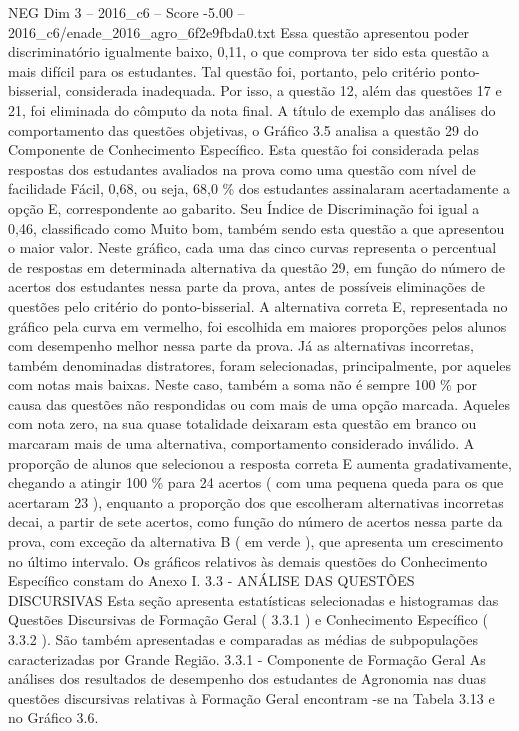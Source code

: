 \begin{textsample}{NEG Dim 3 – 2016\_c6 – Score -5.00 – 2016\_c6/enade\_2016\_agro\_6f2e9fbda0.txt}
Essa questão apresentou poder discriminatório igualmente baixo, 0,11, o que comprova ter sido esta questão a mais difícil para os estudantes.
Tal questão foi, portanto, pelo critério ponto-bisserial, considerada inadequada.
Por isso, a questão 12, além das questões 17 e 21, foi eliminada do cômputo da nota final.
A título de exemplo das análises do comportamento das questões objetivas, o Gráfico 3.5 analisa a questão 29 do Componente de Conhecimento Específico.
Esta questão foi considerada pelas respostas dos estudantes avaliados na prova como uma questão com nível de facilidade Fácil, 0,68, ou seja, 68,0 \% dos estudantes assinalaram acertadamente a opção E, correspondente ao gabarito.
Seu Índice de Discriminação foi igual a 0,46, classificado como Muito bom, também sendo esta questão a que apresentou o maior valor.
Neste gráfico, cada uma das cinco curvas representa o percentual de respostas em determinada alternativa da questão 29, em função do número de acertos dos estudantes nessa parte da prova, antes de possíveis eliminações de questões pelo critério do ponto-bisserial.
A alternativa correta E, representada no gráfico pela curva em vermelho, foi escolhida em maiores proporções pelos alunos com desempenho melhor nessa parte da prova.
Já as alternativas incorretas, também denominadas distratores, foram selecionadas, principalmente, por aqueles com notas mais baixas.
Neste caso, também a soma não é sempre 100 \% por causa das questões não respondidas ou com mais de uma opção marcada.
Aqueles com nota zero, na sua quase totalidade deixaram esta questão em branco ou marcaram mais de uma alternativa, comportamento considerado inválido.
A proporção de alunos que selecionou a resposta correta E aumenta gradativamente, chegando a atingir 100 \% para 24 acertos ( com uma pequena queda para os que acertaram 23 ), enquanto a proporção dos que escolheram alternativas incorretas decai, a partir de sete acertos, como função do número de acertos nessa parte da prova, com exceção da alternativa B ( em verde ), que apresenta um crescimento no último intervalo.
Os gráficos relativos às demais questões do Conhecimento Específico constam do Anexo I. 3.3 - ANÁLISE DAS QUESTÕES DISCURSIVAS Esta seção apresenta estatísticas selecionadas e histogramas das Questões Discursivas de Formação Geral ( 3.3.1 ) e Conhecimento Específico ( 3.3.2 ).
São também apresentadas e comparadas as médias de subpopulações caracterizadas por Grande Região. 3.3.1 - Componente de Formação Geral As análises dos resultados de desempenho dos estudantes de Agronomia nas duas questões discursivas relativas à Formação Geral encontram -se na Tabela 3.13 e no Gráfico 3.6.

\end{textsample}
